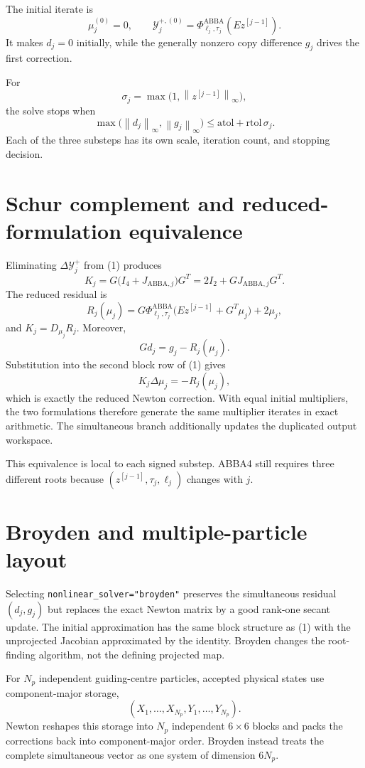 \documentclass[11pt,a4paper]{article}
\newcommand{\Id}{I}
\newcommand{\Y}{\mathcal{Y}}
\newcommand{\PhiAB}{\Phi^{\mathrm{ABBA}}}
\newcommand{\norm}[1]{\left\lVert #1\right\rVert}
\begin{document}
The initial iterate is
\[
 \mu_j^{(0)}=0,
 \qquad
 \Y_j^{+,(0)}
 =\PhiAB_{\ell_j,\tau_j}(Ez^{[j-1]}).
\]
It makes $d_j=0$ initially, while the generally nonzero copy difference $g_j$
drives the first correction.

For
\[
 \sigma_j=\max\bigl(1,\norm{z^{[j-1]}}_\infty\bigr),
\]
the solve stops when
\[
 \max\bigl(\norm{d_j}_\infty,\norm{g_j}_\infty\bigr)
 \leq \mathrm{atol}+\mathrm{rtol}\,\sigma_j.
\]
Each of the three substeps has its own scale, iteration count, and stopping
decision.

\section{Schur complement and reduced-formulation equivalence}

Eliminating $\Delta\Y_j^+$ from (1) produces
\[
 K_j
 =G\bigl(\Id_4+J_{\mathrm{ABBA},j}\bigr)G^T
 =2\Id_2+GJ_{\mathrm{ABBA},j}G^T.
\]
The reduced residual is
\[
 R_j(\mu_j)
 =G\PhiAB_{\ell_j,\tau_j}
   \bigl(Ez^{[j-1]}+G^T\mu_j\bigr)+2\mu_j,
\]
and $K_j=D_{\mu_j}R_j$.  Moreover,
\[
 Gd_j=g_j-R_j(\mu_j).
\]
Substitution into the second block row of (1) gives
\[
 K_j\Delta\mu_j=-R_j(\mu_j),
\]
which is exactly the reduced Newton correction.  With equal initial
multipliers, the two formulations therefore generate the same multiplier
iterates in exact arithmetic.  The simultaneous branch additionally updates
the duplicated output workspace.

This equivalence is local to each signed substep.  ABBA4 still requires three
different roots because $(z^{[j-1]},\tau_j,\ell_j)$ changes with $j$.

\section{Broyden and multiple-particle layout}

Selecting \texttt{nonlinear\_solver="broyden"} preserves the simultaneous
residual $(d_j,g_j)$ but replaces the exact Newton matrix by a good rank-one
secant update.  The initial approximation has the same block structure as (1)
with the unprojected Jacobian approximated by the identity.  Broyden changes
the root-finding algorithm, not the defining projected map.

For $N_p$ independent guiding-centre particles, accepted physical states use
component-major storage,
\[
 (X_1,\ldots,X_{N_p},Y_1,\ldots,Y_{N_p}).
\]
Newton reshapes this storage into $N_p$ independent $6\times6$ blocks and packs
the corrections back into component-major order.  Broyden instead treats the
complete simultaneous vector as one system of dimension $6N_p$.
\end{document}

